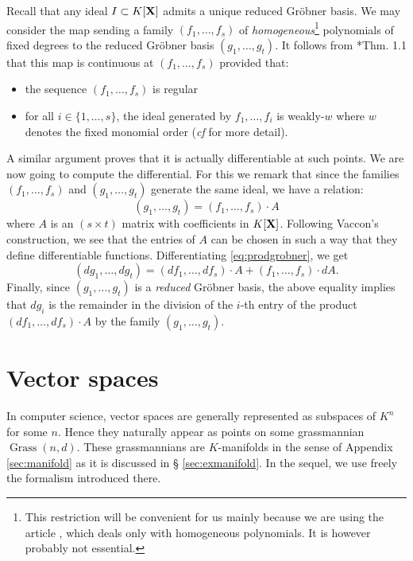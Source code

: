 \documentclass{sig-alternate}
\DeclareMathOperator{\Grass}{Grass}
\begin{document}
{Recall that any 
ideal $I \subset K[\mathbf X]$ admits a unique reduced Gr\"obner basis. We may
consider the map sending a family $(f_1, \ldots, f_s)$ of 
\emph{homogeneous}\footnote{This restriction will be convenient for us 
mainly because we are using the article \cite{vaccon:14a}, which deals only 
with homogeneous polynomials. It is however probably not essential.} 
polynomials of fixed degrees to the reduced Gr\"obner basis $(g_1, 
\ldots, g_t)$. It follows from \cite{vaccon:14a}*{Thm. 1.1} that this 
map is continuous at $(f_1, \ldots, f_s)$ provided that:
\begin{itemize}
\item the sequence $(f_1, \ldots, f_s)$ is regular
\item for all $i \in \{1, \ldots, s\}$, the ideal generated by
$f_1, \ldots, f_i$ is weakly-$w$ where $w$ denotes the fixed monomial
order (\emph{cf} \cite{vaccon:14a} for more detail).
\end{itemize}
A similar argument proves that it is actually differentiable at such
points. We are now going to compute the differential. For this we
remark that since the families $(f_1, \ldots, f_s)$ and $(g_1, \ldots,
g_t)$ generate the same ideal, we have a relation:
\begin{equation}
\label{eq:prodgrobner}
(g_1, \ldots, g_t) = (f_1, \ldots, f_s) \cdot A
\end{equation}
where $A$ is an $(s \times t)$ matrix with coefficients in $K[\mathbf X]$.
Following Vaccon's construction, we see that the entries of $A$ 
can be chosen in such a way that they define differentiable functions.
Differentiating \eqref{eq:prodgrobner}, we get
$$(d g_1, \ldots, d g_t) =
(d f_1, \ldots, d f_s) \cdot A + (f_1, \ldots, f_s) \cdot dA.$$
Finally, since $(g_1, \ldots, g_t)$ is a \emph{reduced} Gr\"obner
basis, the above equality implies that $d g_i$ is the remainder in
the division of the $i$-th entry of the product
$(d f_1, \ldots, d f_s) \cdot A$ by the family $(g_1, \ldots, g_t)$.

\section{Vector spaces}
\label{sec:vectorspaces}

In computer science, vector spaces are generally represented as subspaces 
of $K^n$ for some $n$. Hence they naturally appear as points on some 
grassmannian $\Grass(n,d)$. These grassmannians are $K$-manifolds in the 
sense of Appendix \ref{sec:manifold} as it is discussed in \S 
\ref{sec:exmanifold}. In the sequel, we use freely the formalism 
introduced there.

}
\end{document}

